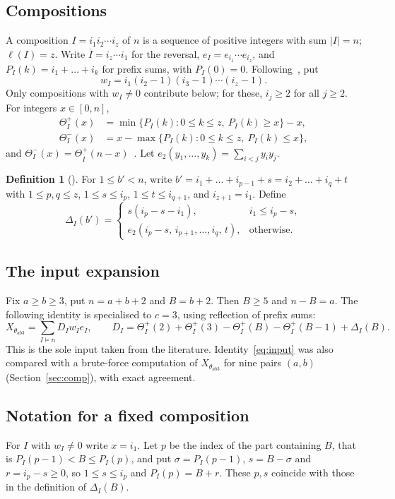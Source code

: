 \documentclass[11pt]{article}
\theoremstyle{remark}
\theoremstyle{definition}
\newtheorem{definition}{Definition}
\newcommand{\rev}{\overline}
\newcommand{\Tp}{\Theta^{+}}
\newcommand{\Tm}{\Theta^{-}}
\begin{document}
\subsection{Compositions}
A composition $I=i_1i_2\cdots i_z$ of $n$ is a sequence of positive integers with sum $|I|=n$; $\ell(I)=z$. Write $\rev I=i_z\cdots i_1$ for the reversal, $e_I=e_{i_1}\cdots e_{i_z}$, and $P_I(k)=i_1+\dots+i_k$ for prefix sums, with $P_I(0)=0$. Following~\cite{ChenHeWang2024}, put
\[
w_I=i_1(i_2-1)(i_3-1)\cdots(i_z-1).
\]
Only compositions with $w_I\ne0$ contribute below; for these, $i_j\ge 2$ for all $j\ge 2$. For integers $x\in[0,n]$,
\begin{align*}
\Tp_I(x)&=\min\{P_I(k):0\le k\le z,\ P_I(k)\ge x\}-x,\\
\Tm_I(x)&=x-\max\{P_I(k):0\le k\le z,\ P_I(k)\le x\},
\end{align*}
and $\Tm_I(x)=\Tp_{\rev I}(n-x)$~\cite[Lemma~2.5]{ChenHeWang2024}. Let $e_2(y_1,\dots,y_k)=\sum_{i<j}y_iy_j$.

\begin{definition}[{\cite{Wang2024cyclechords,ChenHeWang2024}}]
For $1\le b'<n$, write $b'=i_1+\dots+i_{p-1}+s=i_2+\dots+i_q+t$ with $1\le p,q\le z$, $1\le s\le i_p$, $1\le t\le i_{q+1}$, and $i_{z+1}=i_1$. Define
\[
\Delta_I(b')=\begin{cases} s(i_p-s-i_1), & i_1\le i_p-s,\\ e_2(i_p-s,\,i_{p+1},\dots,i_q,\,t), & \text{otherwise.}\end{cases}
\]
\end{definition}

\subsection{The input expansion}
Fix $a\ge b\ge 3$, put $n=a+b+2$ and $B=b+2$. Then $B\ge5$ and $n-B=a$. The following identity is \cite[Theorem~3.1]{ChenHeWang2024} specialised to $c=3$, using reflection of prefix sums:
\begin{equation}\label{eq:input}
X_{\theta_{ab3}}=\sum_{I\models n}D_Iw_Ie_I,\qquad
D_I=\Tp_I(2)+\Tp_I(3)-\Tp_I(B)-\Tp_I(B-1)+\Delta_I(B).
\end{equation}
This is the sole input taken from the literature. Identity~\eqref{eq:input} was also compared with a brute-force computation of $X_{\theta_{ab3}}$ for nine pairs $(a,b)$ (Section~\ref{sec:comp}), with exact agreement.

\subsection{Notation for a fixed composition}
For $I$ with $w_I\ne0$ write $x=i_1$. Let $p$ be the index of the part containing $B$, that is $P_I(p-1)<B\le P_I(p)$, and put $\sigma=P_I(p-1)$, $s=B-\sigma$ and $r=i_p-s\ge0$, so $1\le s\le i_p$ and $P_I(p)=B+r$. These $p,s$ coincide with those in the definition of $\Delta_I(B)$.
\end{document}
